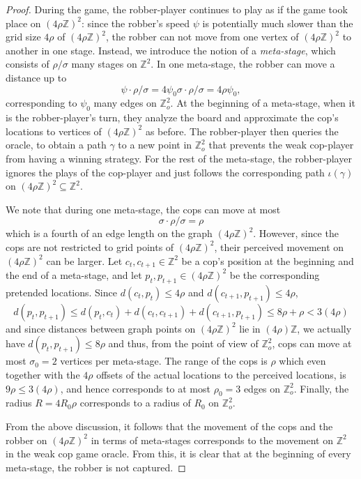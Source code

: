 \documentclass{amsart}
\theoremstyle{definition}
\theoremstyle{remark}
\theoremstyle{remark}
\theoremstyle{definition}
\newcommand{\rhoZ}{(4\rho\mathbb{Z})^2}
\newcommand{\Zo}{\mathbb{Z}_o^2}
\newcommand{\Z}{\mathbb{Z}} %
\renewcommand{\leq}{\leqslant}
\begin{document}
\begin{proof}
 During the game, the robber-player continues to play as if the game took place on $\rhoZ$: since the robber's speed $\psi$ is potentially much slower than the grid size $4\rho$ of $\rhoZ$, the robber can not move from one vertex of $\rhoZ$ to another in one stage. Instead, we introduce the notion of a \emph{meta-stage}, which consists of $\rho/\sigma$ many stages on $\mathbb{Z}^2$. In one meta-stage, the robber can move a distance up to
 $$
 \psi \cdot \rho/\sigma = 4 \psi_0 \sigma\cdot \rho/\sigma = 4\rho \psi_0,
 $$
 corresponding to $\psi_0$ many edges on $\Zo$. At the beginning of a meta-stage, when it is the robber-player's turn, they analyze the board and approximate the cop's locations to vertices of $\rhoZ$ as before. The robber-player then queries the oracle, to obtain a path $\gamma$ to a new point in $\Zo$ that prevents the weak cop-player from having a winning strategy. For the rest of the meta-stage, the robber-player ignores the plays of the cop-player and just follows the corresponding path $\iota(\gamma)$ on $\rhoZ \subseteq \Z^2$.
 
We note that during one meta-stage, the cops can move at most
 $$
 \sigma \cdot \rho/\sigma = \rho
 $$
 which is a fourth of an edge length on the graph $\rhoZ$. However, since the cops are not restricted to grid points of $\rhoZ$, their perceived movement on $\rhoZ$ can be larger. Let $c_t,c_{t+1} \in \mathbb{Z}^2$ be a cop's position at the beginning and the end of a meta-stage, and let $p_t,p_{t+1} \in \rhoZ$ be the corresponding pretended locations. Since $d(c_t,p_t) \leq 4\rho$ and $d(c_{t+1},p_{t+1}) \leq 4\rho$,
 $$
 d(p_t, p_{t+1}) \leq d(p_t,c_t) + d(c_t,c_{t+1}) + d(c_{t+1},p_{t+1}) \leq 8\rho+\rho < 3(4\rho)
 $$
 and since distances between graph points on $\rhoZ$ lie in $(4\rho)\mathbb{Z}$, we actually have $d(p_t,p_{t+1})\leq 8\rho$ and thus, from the point of view of $\Zo$, cops can move at most $\sigma_0 = 2$ vertices per meta-stage. The range of the cops is $\rho$ which even together with the $4\rho$ offsets of the actual locations to the perceived locations, is $9\rho \leq 3(4\rho)$, and hence corresponds to at most $\rho_0 = 3$ edges on $\Zo$. Finally, the radius $R = 4R_0\rho$ corresponds to a radius of $R_0$ on $\Zo$.

 From the above discussion, it follows that the movement of the cops and the robber on $\rhoZ$ in terms of meta-stages corresponds to the movement on $\Z^2$ in the weak cop game oracle. From this, it is clear that at the beginning of every meta-stage, the robber is not captured.


\end{proof}
\end{document}
